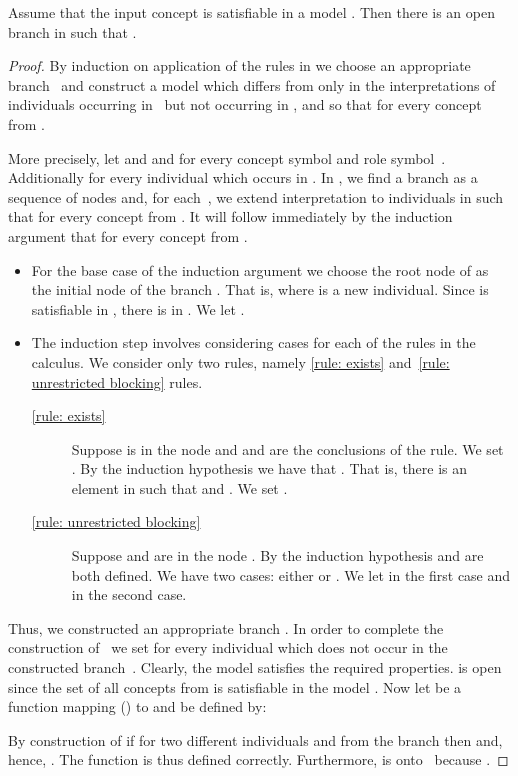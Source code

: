 \documentclass[leqno
,pdflatex
,prodmode
,acmtocl
]{acmsmall}
\begin{document}
\begin{lemma}\label{lemma: some magic}
Assume that the input concept  is satisfiable in a model .
Then there is an open branch  in  such that
.
\end{lemma}
\begin{proof}
By induction on application of the rules in 
we choose an appropriate branch~
and construct a model  which 
differs from 
only in the interpretations of individuals occurring in~
but not occurring in ,
and so that
 for every concept  from .

More precisely, 
let  and
 and 
for every concept symbol  and role symbol~.
Additionally  for every individual 
which occurs in .
In ,
we find a branch  
as a sequence of nodes 
and, for each~,  we
extend interpretation  to individuals in 
such that  for every concept  from .
It will follow immediately by the induction argument that
 for every concept  from .
\begin{itemize}
 \item For the base case of the induction argument
        we choose the root node of  as the initial node  of the branch .
	That is,  where  is a new individual.
        Since  is satisfiable in , there is  in .
        We let .
 \item The induction step involves considering cases for each of the rules in the  calculus.
       We consider only two rules, namely \eqref{rule: exists} and~\eqref{rule: unrestricted blocking} rules.
       \begin{description}
        \item[\eqref{rule: exists}] Suppose  is in the node 
              and  and  are the conclusions of the rule. 
              We set .
              By the induction hypothesis we have that .
              That is, there is an element  in  such that 
               and .
              We set .
        \item[\eqref{rule: unrestricted blocking}]
              Suppose  and  are in the node .
              By the induction hypothesis  and  are both defined.
              We have two cases: either  or .
              We let  in the first case and
                 in the second case.
       \end{description}
\end{itemize}
Thus, we constructed an appropriate branch .
In order to complete the construction of~ we set 
 for every individual 
which does not occur in the constructed branch~.
Clearly, the model  satisfies the required properties.
 is open since  the set of all concepts from  is satisfiable in the model .
Now let  be a function mapping  () to 
and be defined by:

By construction of 
if  for two different individuals  and  
from the branch 
then  and, hence,
.
The function  is thus defined correctly.
Furthermore,  is onto~ because 
.
\end{proof}
\end{document}
